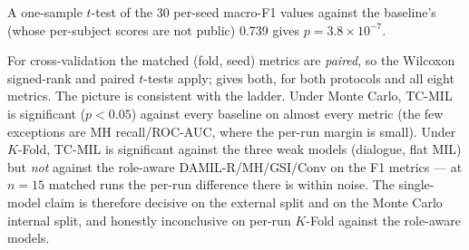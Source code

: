 \documentclass[conference]{IEEEtran}
\begin{document}
A
one-sample $t$-test of the 30 per-seed macro-F1 values against the baseline's (whose per-subject scores are not public) \cite{milintsevich2023}
0.739 gives $p=3.8\!\times\!10^{-7}$.

For cross-validation the matched (fold, seed) metrics are \emph{paired}, so the
Wilcoxon signed-rank and paired $t$-tests apply;  gives both,
for both protocols and all eight metrics. The picture is consistent with the
ladder. Under Monte Carlo, TC-MIL is significant ($p<0.05$) against every
baseline on almost every metric (the few exceptions are MH recall/ROC-AUC,
where the per-run margin is small). Under $K$-Fold, TC-MIL is significant
against the three weak models (dialogue, flat MIL) but \emph{not} against the
role-aware DAMIL-R/MH/GSI/Conv on the F1 metrics --- at $n=15$ matched runs the
per-run difference there is within noise. The single-model claim is therefore
decisive on the external split and on the Monte Carlo internal split, and
honestly inconclusive on per-run $K$-Fold against the role-aware models.
\end{document}
